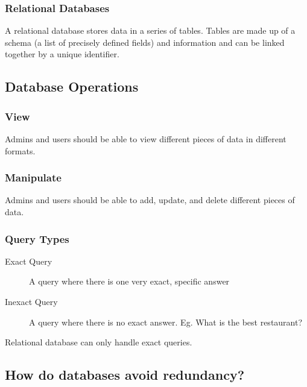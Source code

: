 \subsubsection{Relational Databases}\label{ssub:relational_databases}

A relational database stores data in a series of tables.
Tables are made up of a schema (a list of precisely defined fields) and information and can be linked together by a unique identifier.

\subsection{Database Operations}\label{sub:database_operations}

\subsubsection{View}\label{ssub:dsr_view}

Admins and users should be able to view different pieces of data in different formats.

\subsubsection{Manipulate}\label{ssub:manipulate}

Admins and users should be able to add, update, and delete different pieces of data.

\subsubsection{Query Types}\label{ssub:query_types}

\begin{description}
    \item[Exact Query] A query where there is one very exact, specific answer
        \item[Inexact Query] A query where there is no exact answer. Eg. What is the best restaurant?
\end{description}

\begin{note}
    Relational database can only handle exact queries.
\end{note}

\subsection{How do databases avoid redundancy?}\label{sub:avoiding_redundancy}

